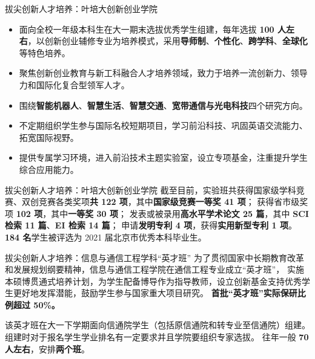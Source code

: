 \documentclass[aspectratio=169, utf8, fontset=windows]{beamer}
\begin{document}
\begin{frame}{拔尖创新人才培养：叶培大创新创业学院}
    \begin{itemize}
        \item 面向全校一年级本科生在大一期末选拔优秀学生组建，每年选拔 \textcolor{Fore}{\textbf{100 人左右}}，以创新创业辅修专业为培养模式，采用\textcolor{Fore}{\textbf{导师制}}、\textcolor{Fore}{\textbf{个性化}}、\textcolor{Fore}{\textbf{跨学科}}、\textcolor{Fore}{\textbf{全球化}}等特色培养。
        \item 聚焦创新创业教育与新工科融合人才培养领域，致力于培养一流创新力、领导力和国际化复合型领军人才。
        \item 围绕\textcolor{Fore}{\textbf{智能机器人}}、\textcolor{Fore}{\textbf{智慧生活}}、\textcolor{Fore}{\textbf{智慧交通}}、\textcolor{Fore}{\textbf{宽带通信与光电科技}}四个研究方向。
        \item 不定期组织学生参与国际名校短期项目，学习前沿科技、巩固英语交流能力、拓宽国际视野。
        \item 提供专属学习环境，进入前沿技术主题实验室，设立专项基金，注重提升学生综合应用能力。
    \end{itemize}
\end{frame}

\begin{frame}{拔尖创新人才培养：叶培大创新创业学院}
    截至目前，实验班共获得国家级学科竞赛、双创竞赛各类奖项\textcolor{Fore}{\textbf{共 122 项}}，其中\textcolor{Fore}{\textbf{国家级竞赛一等奖 41 项}}；
    获得省市级奖项 \textcolor{Fore}{\textbf{102 项}}，其中\textcolor{Fore}{\textbf{一等奖 30 项}}；
    发表或被录用\textcolor{Fore}{\textbf{高水平学术论文 25 篇}}，其中 \textcolor{Fore}{\textbf{SCI 检索 11 篇}}、\textcolor{Fore}{\textbf{EI 检索 14 篇}}；
    申请\textcolor{Fore}{\textbf{发明专利 4 项}}，获得\textcolor{Fore}{\textbf{实用新型专利 1 项}}。
    \textcolor{Fore}{\textbf{184 名}}学生被评选为 2021 届北京市优秀本科毕业生。
\end{frame}

\begin{frame}{拔尖创新人才培养：信息与通信工程学科“英才班”}
    为了贯彻国家中长期教育改革和发展规划纲要精神，信息与通信工程学院在通信工程专业成立“英才班”，
    实施本硕博贯通式培养计划，为学生配备博导作为指导教师，设立创新基金支持优秀学生更好地发挥潜能，鼓励学生参与国家重大项目研究。
    \textcolor{Fore}{\textbf{首批“英才班”实际保研比例超过 50\%。}}

    该英才班在大一下学期面向信通院学生（包括原信通院和转专业至信通院）组建。
    组建时对于报名学生学业排名有一定要求并且学院要组织专家选拔。
    往年一般 \textcolor{Fore}{\textbf{70 人左右}}，安排\textcolor{Fore}{\textbf{两个班}}。
\end{frame}
\end{document}
